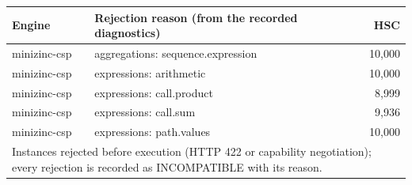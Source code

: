 \begin{tabular}{llr}
\toprule
Engine & Rejection reason (from the recorded diagnostics) & HSC \\
\midrule
minizinc-csp & aggregations: sequence.expression & 10,000 \\
minizinc-csp & expressions: arithmetic & 10,000 \\
minizinc-csp & expressions: call.product & 8,999 \\
minizinc-csp & expressions: call.sum & 9,936 \\
minizinc-csp & expressions: path.values & 10,000 \\
\bottomrule
\multicolumn{3}{l}{\footnotesize Instances rejected before execution (HTTP 422 or capability negotiation); every rejection is recorded as INCOMPATIBLE with its reason.}
\end{tabular}
